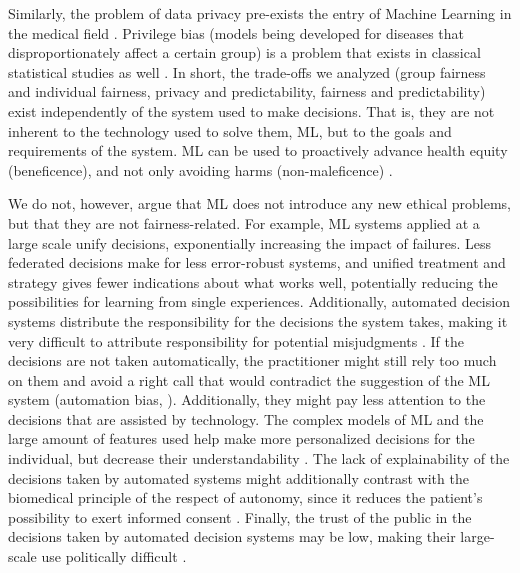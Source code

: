 Similarly, the problem of data privacy pre-exists the entry of Machine Learning in the medical field \cite[p.~346]{Dijkstra2020}.
Privilege bias (models being developed for diseases that disproportionately affect a certain group) \cite[p.~5]{Rajkomar2018} is a problem that exists in classical statistical studies as well \cite{Jackson2019}.
In short, the trade-offs we analyzed (group fairness and individual fairness, privacy and predictability, fairness and predictability) exist independently of the system used to make decisions.
That is, they are not inherent to the technology used to solve them, ML, but to the goals and requirements of the system.
ML can be used to proactively advance health equity (beneficence), and not only avoiding harms (non-maleficence) \cite[p.~2]{Rajkomar2018}.

We do not, however, argue that ML does not introduce any new ethical problems, but that they are not fairness-related.
For example, ML systems applied at a large scale unify decisions, exponentially increasing the impact of failures.
Less federated decisions make for less error-robust systems, and unified treatment and strategy gives fewer indications about what works well, potentially reducing the possibilities for learning from single experiences.
Additionally, automated decision systems distribute the responsibility for the decisions the system takes, making it very difficult to attribute responsibility for potential misjudgments \cite[p.~6]{Morley2020}.
If the decisions are not taken automatically, the practitioner might still rely too much on them and avoid a right call that would contradict the suggestion of the ML system \cite[p.~4]{Morley2020} (automation bias, \cite[p.~4]{Rajkomar2018}).
Additionally, they might pay less attention to the decisions that are assisted by technology.
The complex models of ML and the large amount of features used help make more personalized decisions for the individual, but decrease their understandability \cite[p.~4]{Rajkomar2018}.
The lack of explainability of the decisions taken by automated systems might additionally contrast with the biomedical principle of the respect of autonomy, since it reduces the patient's possibility to exert informed consent \cite[p.~346]{Dijkstra2020}.
Finally, the trust of the public in the decisions taken by automated decision systems may be low, making their large-scale use politically difficult \cite[p.~4]{Morley2020}.


